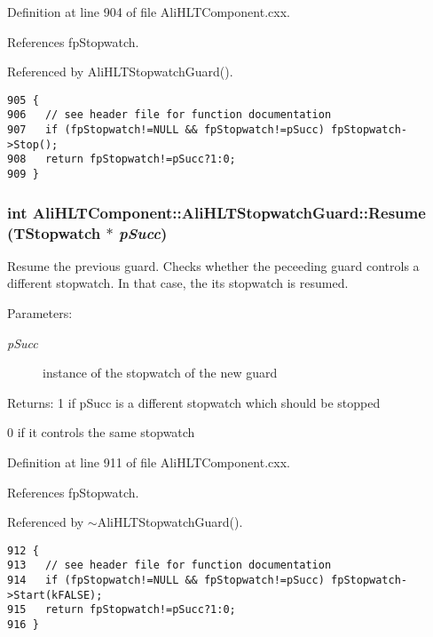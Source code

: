Definition at line 904 of file Ali\-HLTComponent.cxx.

References fp\-Stopwatch.

Referenced by Ali\-HLTStopwatch\-Guard().

\footnotesize\begin{verbatim}905 {
906   // see header file for function documentation
907   if (fpStopwatch!=NULL && fpStopwatch!=pSucc) fpStopwatch->Stop();
908   return fpStopwatch!=pSucc?1:0;
909 }
\end{verbatim}\normalsize 


\subsubsection{\setlength{\rightskip}{0pt plus 5cm}int Ali\-HLTComponent::Ali\-HLTStopwatch\-Guard::Resume (TStopwatch $\ast$ {\em p\-Succ})\hspace{0.3cm}{\tt  [private]}}\label{classAliHLTComponent_1_1AliHLTStopwatchGuard_d1}


Resume the previous guard. Checks whether the peceeding guard controls a different stopwatch. In that case, the its stopwatch is resumed. \begin{Desc}
\item[Parameters:]
\begin{description}
\item[{\em p\-Succ}]instance of the stopwatch of the new guard \end{description}
\end{Desc}
\begin{Desc}
\item[Returns:]1 if p\-Succ is a different stopwatch which should be stopped\par
 0 if it controls the same stopwatch \end{Desc}


Definition at line 911 of file Ali\-HLTComponent.cxx.

References fp\-Stopwatch.

Referenced by $\sim$Ali\-HLTStopwatch\-Guard().

\footnotesize\begin{verbatim}912 {
913   // see header file for function documentation
914   if (fpStopwatch!=NULL && fpStopwatch!=pSucc) fpStopwatch->Start(kFALSE);
915   return fpStopwatch!=pSucc?1:0;
916 }
\end{verbatim}\normalsize 




